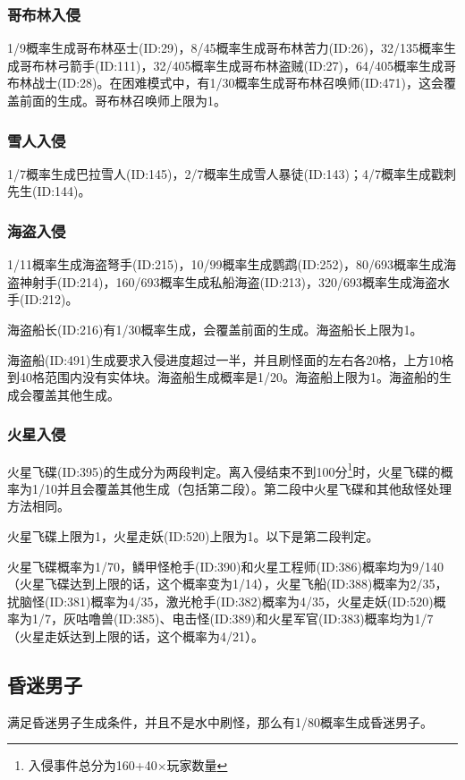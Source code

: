 \subsubsection{哥布林入侵}
1/9概率生成哥布林巫士(ID:29)，8/45概率生成哥布林苦力(ID:26)，32/135概率生成哥布林弓箭手(ID:111)，32/405概率生成哥布林盗贼(ID:27)，64/405概率生成哥布林战士(ID:28)。在困难模式中，有1/30概率生成哥布林召唤师(ID:471)，这会覆盖前面的生成。哥布林召唤师上限为1。

\subsubsection{雪人入侵}
1/7概率生成巴拉雪人(ID:145)，2/7概率生成雪人暴徒(ID:143)；4/7概率生成戳刺先生(ID:144)。

\subsubsection{海盗入侵}
1/11概率生成海盗弩手(ID:215)，10/99概率生成鹦鹉(ID:252)，80/693概率生成海盗神射手(ID:214)，160/693概率生成私船海盗(ID:213)，320/693概率生成海盗水手(ID:212)。

海盗船长(ID:216)有1/30概率生成，会覆盖前面的生成。海盗船长上限为1。

海盗船(ID:491)生成要求入侵进度超过一半，并且刷怪面的左右各20格，上方10格到40格范围内没有实体块。海盗船生成概率是1/20。海盗船上限为1。海盗船的生成会覆盖其他生成。

\subsubsection{火星入侵}
火星飞碟(ID:395)的生成分为两段判定。离入侵结束不到100分\footnote{入侵事件总分为160+40$\times$玩家数量}时，火星飞碟的概率为1/10并且会覆盖其他生成（包括第二段）。第二段中火星飞碟和其他敌怪处理方法相同。

火星飞碟上限为1，火星走妖(ID:520)上限为1。以下是第二段判定。

火星飞碟概率为1/70，鳞甲怪枪手(ID:390)和火星工程师(ID:386)概率均为9/140（火星飞碟达到上限的话，这个概率变为1/14），火星飞船(ID:388)概率为2/35，扰脑怪(ID:381)概率为4/35，激光枪手(ID:382)概率为4/35，火星走妖(ID:520)概率为1/7，灰咕噜兽(ID:385)、电击怪(ID:389)和火星军官(ID:383)概率均为1/7（火星走妖达到上限的话，这个概率为4/21）。

\subsection{昏迷男子}
满足昏迷男子生成条件，并且不是水中刷怪，那么有1/80概率生成昏迷男子。

